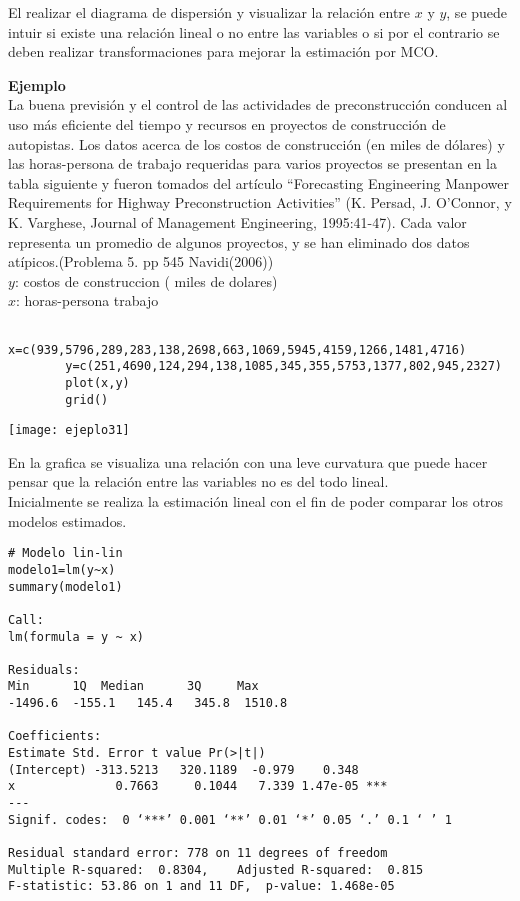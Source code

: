 \documentclass[base=hide,12pt]{elegantbook}
\begin{document}
 El realizar el diagrama de dispersión y visualizar la relación entre $x$ y $y$, se puede intuir si existe una relación lineal o no entre las variables o si por el contrario se deben realizar transformaciones para mejorar la estimación por MCO.
 
\vspace{1cm} 
  \textcolor{col3}{\Large \bf Ejemplo} \\
 
 La buena previsión y el control de las actividades de preconstrucción conducen al uso más eficiente del tiempo y recursos en proyectos de construcción de autopistas. Los datos acerca de los costos de construcción (en miles de dólares) y las horas-persona de trabajo requeridas para varios proyectos se presentan en la tabla siguiente y fueron tomados del artículo “Forecasting Engineering Manpower Requirements for Highway Preconstruction Activities” (K. Persad, J. O’Connor, y K. Varghese, Journal of Management Engineering, 1995:41-47). Cada valor representa un promedio de algunos proyectos, y se han eliminado dos datos atípicos.(Problema 5. pp 545 Navidi(2006))\\
 
$y$: costos de construccion ( miles de dolares)\\
$x$: horas-persona trabajo \\
 
 \begin{Box3}{}
 	\begin{verbatim}
 		x=c(939,5796,289,283,138,2698,663,1069,5945,4159,1266,1481,4716)
 		y=c(251,4690,124,294,138,1085,345,355,5753,1377,802,945,2327)
 		plot(x,y)
 		grid()
 	\end{verbatim}	
 \end{Box3}

\begin{center}
	\texttt{[image: ejeplo31]}
\end{center}

En la grafica se visualiza una relación con una leve curvatura que puede hacer pensar que la relación entre las variables no es del todo lineal.  \\


Inicialmente se realiza la estimación lineal con el fin de poder comparar los otros modelos estimados.


\begin{Box3}{}
\begin{verbatim}
# Modelo lin-lin
modelo1=lm(y~x)
summary(modelo1) 

Call:
lm(formula = y ~ x)

Residuals:
Min      1Q  Median      3Q     Max 
-1496.6  -155.1   145.4   345.8  1510.8 

Coefficients:
Estimate Std. Error t value Pr(>|t|)    
(Intercept) -313.5213   320.1189  -0.979    0.348    
x              0.7663     0.1044   7.339 1.47e-05 ***
---
Signif. codes:  0 ‘***’ 0.001 ‘**’ 0.01 ‘*’ 0.05 ‘.’ 0.1 ‘ ’ 1

Residual standard error: 778 on 11 degrees of freedom
Multiple R-squared:  0.8304,	Adjusted R-squared:  0.815 
F-statistic: 53.86 on 1 and 11 DF,  p-value: 1.468e-05	
\end{verbatim}
\end{Box3}
\end{document}
